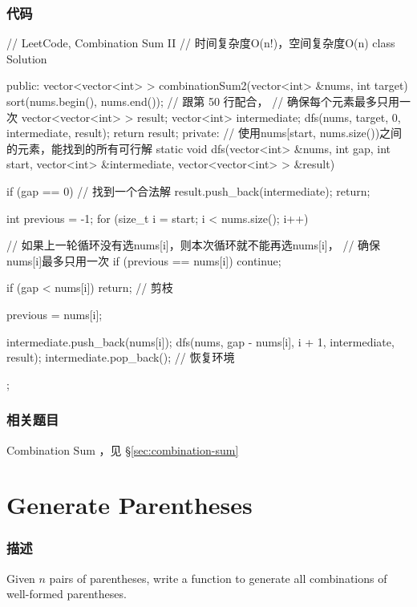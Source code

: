\subsubsection{代码}
\begin{Code}
// LeetCode, Combination Sum II
// 时间复杂度O(n!)，空间复杂度O(n)
class Solution {
public:
    vector<vector<int> > combinationSum2(vector<int> &nums, int target) {
        sort(nums.begin(), nums.end()); // 跟第 50 行配合，
                                             // 确保每个元素最多只用一次
        vector<vector<int> > result;
        vector<int> intermediate;
        dfs(nums, target, 0, intermediate, result);
        return result;
    }
private:
    // 使用nums[start, nums.size())之间的元素，能找到的所有可行解
    static void dfs(vector<int> &nums, int gap, int start,
            vector<int> &intermediate, vector<vector<int> > &result) {
        if (gap == 0) {  //  找到一个合法解
            result.push_back(intermediate);
            return;
        }

        int previous = -1;
        for (size_t i = start; i < nums.size(); i++) {
            // 如果上一轮循环没有选nums[i]，则本次循环就不能再选nums[i]，
            // 确保nums[i]最多只用一次
            if (previous == nums[i]) continue;

            if (gap < nums[i]) return;  // 剪枝

            previous = nums[i];

            intermediate.push_back(nums[i]);
            dfs(nums, gap - nums[i], i + 1, intermediate, result);
            intermediate.pop_back();  // 恢复环境
        }
    }
};
\end{Code}


\subsubsection{相关题目}
\begindot
\item Combination Sum ，见 \S \ref{sec:combination-sum}
\myenddot


\section{Generate Parentheses } %
\label{sec:generate-parentheses}


\subsubsection{描述}
Given $n$ pairs of parentheses, write a function to generate all combinations of well-formed parentheses.

